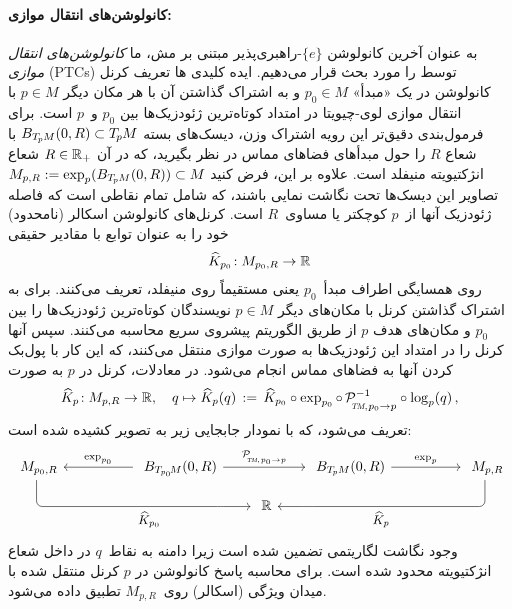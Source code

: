 \paragraph{کانولوشن‌های انتقال موازی:}
به عنوان آخرین کانولوشن $\{e\}$-راهبری‌پذیر مبتنی بر مش، ما \emph{کانولوشن‌های انتقال موازی} (PTCs) توسط \citet{schonsheck2018parallel} را مورد بحث قرار می‌دهیم.
ایده کلیدی ها تعریف کرنل کانولوشن در یک «مبدأ» $p_0 \in M$ و به اشتراک گذاشتن آن با هر مکان دیگر $p\in M$ با انتقال موازی لوی-چیویتا در امتداد کوتاه‌ترین ژئودزیک‌ها بین $p_0$ و~$p$ است.
برای فرمول‌بندی دقیق‌تر این رویه اشتراک وزن، دیسک‌های بسته $B_{T_{\mkern-1.5mu p}\mkern-.5muM}(0,R) \subset T_{\mkern-1.5mu p}\mkern-.5muM$ با شعاع $R$ را حول مبدأهای فضاهای مماس در نظر بگیرید، که در آن $R\in\mathbb{R}_+$ شعاع انژکتیویته منیفلد است.
علاوه بر این، فرض کنید $M_{p,R} := \exp_p( B_{T_{\mkern-1.5mu p}\mkern-.5muM}(0,R)) \subset M$ تصاویر این دیسک‌ها تحت نگاشت نمایی باشند، که شامل تمام نقاطی است که فاصله ژئودزیک آنها از~$p$ کوچکتر یا مساوی~$R$ است.
\citet{schonsheck2018parallel} کرنل‌های کانولوشن اسکالر (نامحدود) خود را به عنوان توابع با مقادیر حقیقی
\begin{align}
    \widehat{K}_{p_0} \!: M_{p_0,R} \to \R
\end{align}
روی همسایگی اطراف مبدأ~$p_0$ یعنی مستقیماً روی منیفلد، تعریف می‌کنند.
برای به اشتراک گذاشتن کرنل با مکان‌های دیگر $p\in M$ نویسندگان کوتاه‌ترین ژئودزیک‌ها را بین $p_0$ و مکان‌های هدف $p$ از طریق الگوریتم پیشروی سریع محاسبه می‌کنند.
سپس آنها کرنل را در امتداد این ژئودزیک‌ها به صورت موازی منتقل می‌کنند، که این کار با پول‌بک کردن آنها به فضاهای مماس انجام می‌شود.
در معادلات، کرنل در $p$ به صورت
\begin{align}\label{eq:PTCs_kernel_transport}
    \widehat{K}_p \!: M_{p,R} \to \R ,\quad
    q \mapsto \widehat{K}_p(q) \,:=\,
    \widehat{K}_{p_0} \circ \exp_{p_0} \circ\,
    \mathcal{P}_{\mkern-2mu\overset{}{\protect\scalebox{.6}{$\!T\!M$}\mkern-2mu,\mkern1mu p_0\to p}}^{-1}
    \circ \log_p (q) \,,
\end{align}
تعریف می‌شود، که با نمودار جابجایی زیر به تصویر کشیده شده است:
\begin{equation}\label{cd:PTC_kernel_1}
\begin{tikzcd}[column sep=50, row sep=10, font=\normalsize]
    M_{p_0,R}
        \arrow[drr, rounded corners, to path={ 
            |-node[below, pos=.8]{\small$\widehat{K}_{p_0}$} ([xshift=-5.ex]\tikztotarget.west) 
            -- (\tikztotarget.west)
            }]
    & B_{T_{\mkern-1.mu p_0}\!M}(0,R)
        \arrow[l, "\exp_{p_0}"']
        \arrow[rr, "\mathcal{P}_{\mkern-2mu\overset{}{\protect\scalebox{.6}{$\!T\!M$}\mkern-2mu,\mkern1mu p_0\to p}}"]
    &[-30pt]
    &[-30pt]
      B_{\TpM}(0,R)
        \arrow[r, "\exp_p"]
    & M_{p,R}
        \arrow[dll, rounded corners, to path={ 
            |-node[below, pos=.8]{\small$\widehat{K}_p$} ([xshift=5.ex]\tikztotarget.east) 
            -- (\tikztotarget.east)
            }]
    \\
    & & \R
\end{tikzcd}
\end{equation}
وجود نگاشت لگاریتمی تضمین شده است زیرا دامنه به نقاط~$q$ در داخل شعاع انژکتیویته محدود شده است.
برای محاسبه پاسخ کانولوشن در $p$ کرنل منتقل شده با میدان ویژگی (اسکالر) روی~$M_{p,R}$ تطبیق داده می‌شود.


